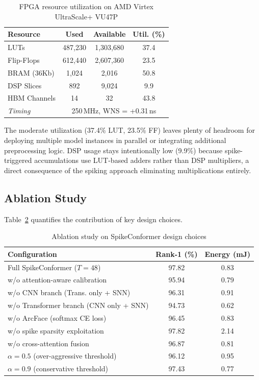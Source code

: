 \documentclass[11pt,a4paper]{article}
\begin{document}
\begin{table}[H]
\centering
\caption{FPGA resource utilization on AMD Virtex UltraScale+ VU47P}
\label{tab:fpga_resources}
\begin{tabular}{@{}lccc@{}}
\toprule
\textbf{Resource} & \textbf{Used} & \textbf{Available} & \textbf{Util. (\%)} \\
\midrule
LUTs & 487,230 & 1,303,680 & 37.4 \\
Flip-Flops & 612,440 & 2,607,360 & 23.5 \\
BRAM (36Kb) & 1,024 & 2,016 & 50.8 \\
DSP Slices & 892 & 9,024 & 9.9 \\
HBM Channels & 14 & 32 & 43.8 \\
\midrule
\textit{Timing} & \multicolumn{3}{c}{250\,MHz, WNS = +0.31\,ns} \\
\bottomrule
\end{tabular}
\end{table}

The moderate utilization (37.4\% LUT, 23.5\% FF) leaves plenty of headroom for deploying multiple model instances in parallel or integrating additional preprocessing logic. DSP usage stays intentionally low (9.9\%) because spike-triggered accumulations use LUT-based adders rather than DSP multipliers, a direct consequence of the spiking approach eliminating multiplications entirely.

\subsection{Ablation Study}

Table~\ref{tab:ablation} quantifies the contribution of key design choices.

\begin{table}[H]
\centering
\caption{Ablation study on SpikeConformer design choices}
\label{tab:ablation}
\begin{tabular}{@{}lcc@{}}
\toprule
\textbf{Configuration} & \textbf{Rank-1 (\%)} & \textbf{Energy (mJ)} \\
\midrule
Full SpikeConformer ($T=48$) & 97.82 & 0.83 \\
\midrule
w/o attention-aware calibration & 95.94 & 0.79 \\
w/o CNN branch (Trans. only + SNN) & 96.31 & 0.91 \\
w/o Transformer branch (CNN only + SNN) & 94.73 & 0.62 \\
w/o ArcFace (softmax CE loss) & 96.45 & 0.83 \\
w/o spike sparsity exploitation & 97.82 & 2.14 \\
w/o cross-attention fusion & 96.87 & 0.81 \\
$\alpha = 0.5$ (over-aggressive threshold) & 96.12 & 0.95 \\
$\alpha = 0.9$ (conservative threshold) & 97.43 & 0.77 \\
\bottomrule
\end{tabular}
\end{table}
\end{document}
